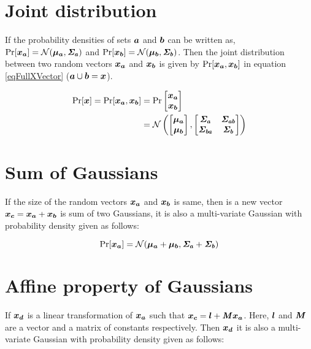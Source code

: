 \section{Joint distribution}
If the probability densities of sets $\boldsymbol{a}$ and $\boldsymbol{b}$ can be written as, $\Pr[\boldsymbol{x_a}] = \mathcal{N}(\boldsymbol{\mu_a}, \bm{\mathit{\Sigma_a}})$ and $\Pr[\boldsymbol{x_b}] = \mathcal{N}(\boldsymbol{\mu_b}, \bm{\mathit{\Sigma_b}})$. Then the joint distribution between two random vectors $\boldsymbol{x_a}$ and $\boldsymbol{x_b}$ is given by $\Pr[\boldsymbol{x_a}, \boldsymbol{x_b}]$ in equation \ref{eqFullXVector} ($\boldsymbol{a} \cup \boldsymbol{b} = \boldsymbol{x}$).

\begin{align}\label{eqFullXVector}
    \Pr  [ \boldsymbol{x}  ]  = \Pr  [ \boldsymbol{x_a}, \boldsymbol{x_b}]& = \Pr \begin{bmatrix}
\boldsymbol{x_a}\\ 
\boldsymbol{x_b}
\end{bmatrix} \\ 
& = \mathcal{N} \left ( \begin{bmatrix}
\boldsymbol{\mu_a}\\ 
\boldsymbol{\mu_b}
\end{bmatrix}, \begin{bmatrix}
\bm{\mathit{\Sigma_a}} & \bm{\mathit{\Sigma_{ab}}}\\ 
\bm{\mathit{\Sigma_{ba}}} & \bm{\mathit{\Sigma_b}}
\end{bmatrix} \right )
\end{align}

\section{Sum of Gaussians}
If the size of the random vectors $\boldsymbol{x_a}$ and $\boldsymbol{x_b}$ is same, then is a new vector $\boldsymbol{x_c} = \boldsymbol{x_a} + \boldsymbol{x_b}$ is sum of two Gaussians, it is also a multi-variate Gaussian with probability density given as follows:

\begin{equation}
    \Pr[\boldsymbol{x_a}] = \mathcal{N}(\boldsymbol{\mu_a} + \boldsymbol{\mu_b}, \bm{\mathit{\Sigma_a}} + \bm{\mathit{\Sigma_b}})
\end{equation}

\section{Affine property of Gaussians}
If $\boldsymbol{x_d}$ is a linear transformation of $\boldsymbol{x_a}$ such that $\boldsymbol{x_c} = \boldsymbol{l} + \bm{\mathit{M}}\boldsymbol{x_a}$. Here, $\boldsymbol{l}$ and $\bm{\mathit{M}}$ are a vector and a matrix of constants respectively. Then $\boldsymbol{x_d}$ it is also a multi-variate Gaussian with probability density given as follows:

